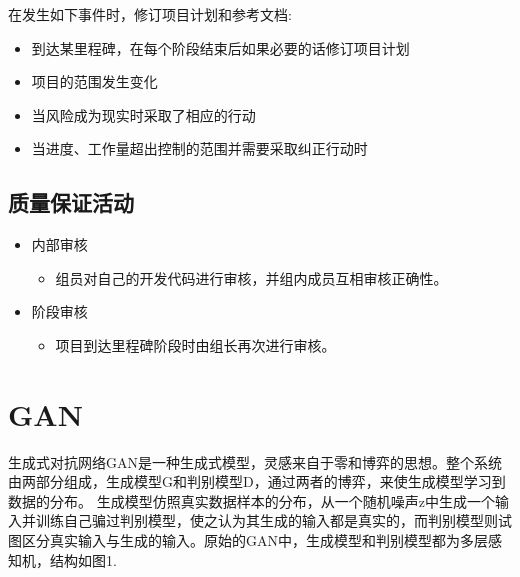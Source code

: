 \documentclass[
  hyperref, a4paper]{ctexart}
\providecommand{\tightlist}{%
  \setlength{\itemsep}{0pt}\setlength{\parskip}{0pt}}
\begin{document}
在发生如下事件时，修订项目计划和参考文档:

\begin{itemize}
\tightlist
\item
  到达某里程碑，在每个阶段结束后如果必要的话修订项目计划
\item
  项目的范围发生变化
\item
  当风险成为现实时采取了相应的行动
\item
  当进度、工作量超出控制的范围并需要采取纠正行动时
\end{itemize}

\hypertarget{ux8d28ux91cfux4fddux8bc1ux6d3bux52a8}{%
\subsection{质量保证活动}\label{ux8d28ux91cfux4fddux8bc1ux6d3bux52a8}}

\begin{itemize}
\tightlist
\item
  内部审核

  \begin{itemize}
  \tightlist
  \item
    组员对自己的开发代码进行审核，并组内成员互相审核正确性。
  \end{itemize}
\item
  阶段审核

  \begin{itemize}
  \tightlist
  \item
    项目到达里程碑阶段时由组长再次进行审核。
  \end{itemize}
\end{itemize}

\hypertarget{gan}{%
\section{GAN}\label{gan}}

生成式对抗网络GAN是一种生成式模型，灵感来自于零和博弈的思想。整个系统由两部分组成，生成模型G和判别模型D，通过两者的博弈，来使生成模型学习到数据的分布。
生成模型仿照真实数据样本的分布，从一个随机噪声z中生成一个输入并训练自己骗过判别模型，使之认为其生成的输入都是真实的，而判别模型则试图区分真实输入与生成的输入。原始的GAN中，生成模型和判别模型都为多层感知机，结构如图1.
\end{document}
